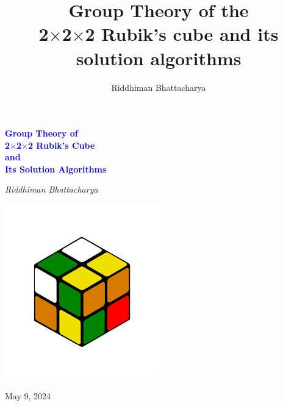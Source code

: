 \documentclass[12pt,a4paper]{article}
\title{Group Theory of the \\ 2$\times$2$\times$2 Rubik's cube and its solution algorithms}
\author{Riddhiman Bhattacharya}
\theoremstyle{custom}
\begin{document}
\begin{titlepage}
    \centering

    {\huge\bfseries \textcolor{blue}{Group Theory of \\ 2$\times$2$\times$2 Rubik's Cube \\ and \\ Its Solution Algorithms}\par}
    \vspace{2cm}
    {\Large\itshape Riddhiman Bhattacharya\par}
    \vspace{2cm}
     \includegraphics[width=0.5\textwidth]{images/2x2scrambled.png}\par\vspace{1cm}
    \vfill

    \vfill

    {\large May 9, 2024 \par}
\end{titlepage}



\setcounter{page}{1}





\end{document}
